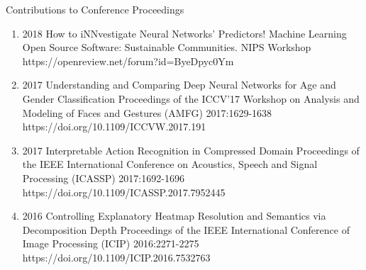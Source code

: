 \documentclass[10pt,a4paper]{article} %
\begin{document}
\headedsection %
{Contributions to Conference Proceedings}{}
{
    \begin{enumerate}
        \item[] 
                                {2018}
                                {How to iNNvestigate Neural Networks' Predictors!}
                                {Machine Learning Open Source Software: Sustainable Communities. NIPS Workshop}
                                {}
                                {https://openreview.net/forum?id=ByeDpyc0Ym}


        \item[] 
                                {2017}
                                {Understanding and Comparing Deep Neural Networks for Age and Gender Classification}
                                {Proceedings of the ICCV'17 Workshop on Analysis and Modeling of Faces and Gestures (AMFG)}
                                {2017:1629-1638}
                                {https://doi.org/10.1109/ICCVW.2017.191}

        \item[] 
                                {2017}
                                {Interpretable Action Recognition in Compressed Domain}
                                {Proceedings of the IEEE International Conference on Acoustics, Speech and Signal Processing (ICASSP)}
                                {2017:1692-1696}
                                {https://doi.org/10.1109/ICASSP.2017.7952445}


        \item[] 
                                {2016}
                                {Controlling Explanatory Heatmap Resolution and Semantics via Decomposition Depth}
                                {Proceedings of the IEEE International Conference of Image Processing (ICIP)}
                                {2016:2271-2275}
                                {https://doi.org/10.1109/ICIP.2016.7532763}



\end{enumerate}}
\end{document}

